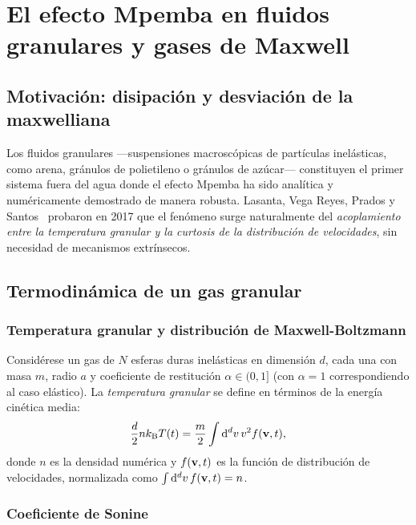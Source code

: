 \chapter{El efecto Mpemba en fluidos granulares y gases de Maxwell}
\label{ch:granular}

\section{Motivación: disipación y desviación de la maxwelliana}

Los fluidos granulares ---suspensiones macroscópicas de partículas inelásticas, 
como arena, gránulos de polietileno o gránulos de azúcar--- constituyen el 
primer sistema fuera del agua donde el efecto Mpemba ha sido analítica y 
numéricamente demostrado de manera robusta. Lasanta, Vega Reyes, Prados y 
Santos~\cite{lasanta2017} probaron en 2017 que el fenómeno surge naturalmente del 
\emph{acoplamiento entre la temperatura granular y la curtosis de la 
distribución de velocidades}, sin necesidad de mecanismos extrínsecos.

\section{Termodinámica de un gas granular}

\subsection{Temperatura granular y distribución de Maxwell-Boltzmann}

Considérese un gas de $N$ esferas duras inelásticas en dimensión $d$, cada una 
con masa $m$, radio $a$ y coeficiente de restitución $\alpha \in (0, 1]$ 
(con $\alpha = 1$ correspondiendo al caso elástico). La \emph{temperatura 
granular} se define en términos de la energía cinética media:
\begin{equation}
    \frac{d}{2} n k_{\mathrm{B}} T(t) = \frac{m}{2} \int \dd[d]{v} v^{2} f(\vb{v},t),
    \label{eq:granular_temp}
\end{equation}
%
donde $n$ es la densidad numérica y $f(\vb{v},t)$ es la función de distribución 
de velocidades, normalizada como $\int \dd[d]{v} f(\vb{v},t) = n$.

\subsection{Coeficiente de Sonine}

